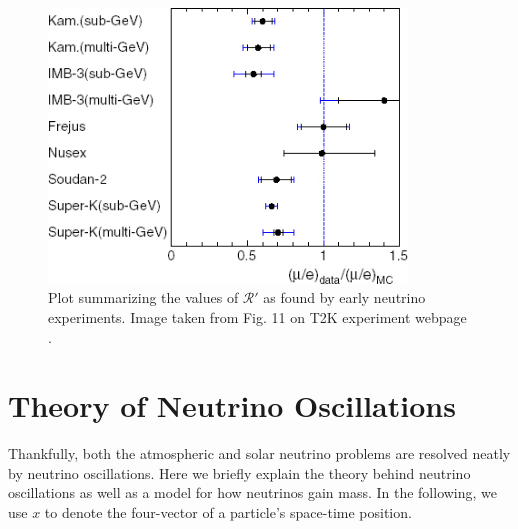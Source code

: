 \begin{figure}
  \centering
  \includegraphics[width=0.85\textwidth,height=0.25\textheight,keepaspectratio]
                {pictures/dblratio.jpg}
  \vspace*{10mm}
  \caption{Plot summarizing the values of $\mathcal{R}'$ as found by early
           neutrino experiments. Image taken from Fig. 11 on T2K experiment
           webpage \cite{T2K}.}
  \label{fig:rprime}
\end{figure}

\section{Theory of Neutrino Oscillations}
Thankfully, both the atmospheric and solar neutrino problems are resolved
neatly by neutrino oscillations.
Here we briefly explain the theory behind neutrino oscillations as well as a
model for how neutrinos gain mass. In the following, we use $x$ to denote
the four-vector of a particle's space-time position.

